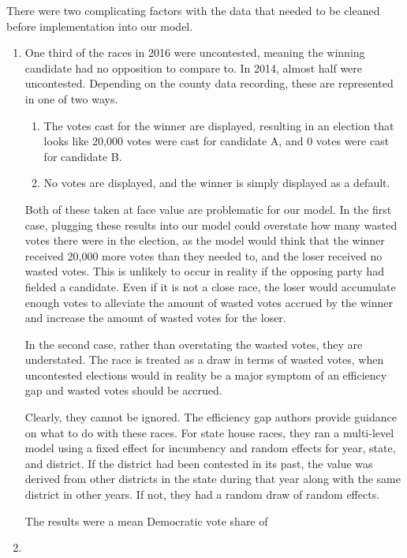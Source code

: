 \documentclass[sigconf]{acmart}
\begin{document}
There were two complicating factors with the data that needed to be cleaned before implementation into our model.
\begin{enumerate}
    \item One third of the races in 2016 were uncontested, meaning the winning candidate had no opposition to compare to. In 2014, almost half were uncontested. Depending on the county data recording, these are represented in one of two ways. 
        \begin{enumerate}
            \item The votes cast for the winner are displayed, resulting in an election that looks like 20,000 votes were cast for candidate A, and 0 votes were cast for candidate B.
            \item No votes are displayed, and the winner is simply displayed as a default.
        \end{enumerate}
    Both of these taken at face value are problematic for our model. In the first case, plugging these results into our model could overstate how many wasted votes there were in the election, as the model would think that the winner received 20,000 more votes than they needed to, and the loser received no wasted votes. This is unlikely to occur in reality if the opposing party had fielded a candidate. Even if it is not a close race, the loser would accumulate enough votes to alleviate the amount of wasted votes accrued by the winner and increase the amount of wasted votes for the loser. 
    
    In the second case, rather than overstating the wasted votes, they are understated. The race is treated as a draw in terms of wasted votes, when uncontested elections would in reality be a major symptom of an efficiency gap and wasted votes should be accrued. 
    
    Clearly, they cannot be ignored. The efficiency gap authors provide guidance on what to do with these races. For state house races, they ran a multi-level model using a fixed effect for incumbency and random effects for year, state, and district. If the district had been contested in its past, the value was derived from other districts in the state during that year along with the same district in other years. If not, they had a random draw of random effects. \cite{chicagouncontested}
    
    The results were a mean Democratic vote share of 
    \item
\end{enumerate}
\end{document}
